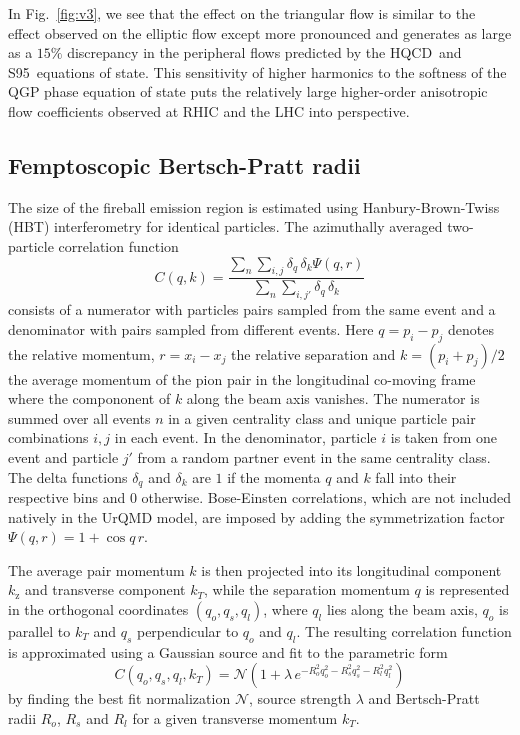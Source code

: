 \documentclass[aps,prc,reprint,amsmath,nofootinbib,superscriptaddress]{revtex4-1}
\newcommand{\hotqcd}{HQCD~}
\newcommand{\spv}{S95~}
\begin{document}
In Fig.~\ref{fig:v3}, we see that the effect on the triangular flow is similar to the effect observed on the elliptic flow except more pronounced and generates as large as a $15\%$ discrepancy in the peripheral flows predicted by the \hotqcd and \spv equations of state. This sensitivity of higher harmonics to the softness of the QGP phase equation of state puts the relatively large higher-order anisotropic flow coefficients observed at RHIC and the LHC into perspective. 

\subsection{Femptoscopic Bertsch-Pratt radii}
\label{hbt}

The size of the fireball emission region is estimated using Hanbury-Brown-Twiss (HBT) interferometry for identical particles. The azimuthally averaged two-particle correlation function 
\begin{equation}
 \label{hbt}
 C(q, k) = \frac{\sum\limits_n \sum\limits_{i, j} \delta_{q} \, \delta_{k}\Psi(q,r)}{\sum\limits_{n} \sum\limits_{i,j'} \delta_{q} \, \delta_{k}}
\end{equation}
consists of a numerator with particles pairs sampled from the same event and a denominator with pairs sampled from different events. Here $q = p_i - p_j$ denotes the relative momentum, $r=x_i-x_j$ the relative separation and $k = (p_i + p_j)/2$ the average momentum of the pion pair in the longitudinal co-moving 
frame where the compononent of $k$ along the beam axis vanishes. The numerator is summed over all events $n$ in a given centrality class and unique particle pair combinations $i,j$ in each event. In the denominator, particle $i$ is
taken from one event and particle $j'$ from a random partner event in the same centrality class. The delta functions $\delta_q$ and $\delta_k$ are $1$ if the momenta $q$ and $k$ fall into their respective bins and $0$ otherwise. Bose-Einsten 
correlations, which are not included natively in the UrQMD model, are imposed by adding the symmetrization factor $\Psi(q,r) = 1 + \cos q\,r$. 

The average pair momentum $k$ is then projected into its longitudinal component $k_\text{z}$ and transverse component $k_T$, while the separation momentum $q$ is represented in the orthogonal coordinates 
$(q_o, q_s, q_l)$, where $q_l$ lies along the beam axis, $q_o$ is parallel to $k_T$ and $q_s$ perpendicular to $q_o$ and $q_l$. The resulting correlation function is approximated using a Gaussian source and 
fit to the parametric form
\begin{equation}
 \label{fitfunction}
 C(q_o, q_s, q_l, k_T) = \mathcal{N} \left(1 + \lambda\, e^{-R_o^2 q_o^2 - R_s^2 q_s^2 - R_l^2 q_l^2} \right) 
\end{equation}
by finding the best fit normalization $\mathcal{N}$, source strength $\lambda$ and Bertsch-Pratt radii $R_o$, $R_s$ and $R_l$ for a given transverse momentum $k_T$. 
\end{document}
